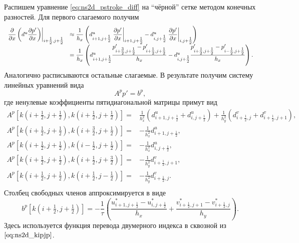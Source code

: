 Распишем уравнение \eqref{eq:ns2d_pstroke_diff}
на ``чёрной'' сетке методом конечных разностей.
Для первого слагаемого получим
\begin{equation}
\label{eq:ns2d_d2pdx2}
\begin{array}{ll}
\left.\dfrac{\partial }{\partial x}\left(d^u \dfrac{\partial p'}{\partial x}\right) \right|_{i+\tfrac12, j+\tfrac12}
    &\approx
        \dfrac{1}{h_x}\left(
            d^u_{i+1, j+\tfrac12} \left. \dfrac{\partial p'}{\partial x} \right|_{i+1, j+\tfrac12} -
            d^u_{i, j+\tfrac12} \left. \dfrac{\partial p'}{\partial x} \right|_{i, j+\tfrac12}
        \right) \\[10pt]

    &=
        \dfrac{1}{h_x}\left(
            d^u_{i+1, j+\tfrac12} \dfrac{p'_{i+\tfrac32,j+\tfrac12} - p'_{i+\tfrac12,j+\tfrac12}}{h_x} - 
            d^u_{i, j+\tfrac12}  \dfrac{p'_{i+\tfrac12,j+\tfrac12} - p'_{i-\tfrac12,j+\tfrac12}}{h_x}
        \right).
\end{array}
\end{equation}
Аналогично расписываются остальные слагаемые. В результате получим систему линейных уравнений вида
\begin{equation}
    \label{eq:ns2d_pstroke_slae}
    A^p p' = b^p,
\end{equation}
где ненулевые коэффициенты пятидиагональной матрицы примут вид
\begin{align}
    \label{eq:ns2d_ap}
    A^p[k(i+\tfrac12, j+\tfrac12), k(i+\tfrac12, j+\tfrac12)] =&
        \frac{1}{h_x^2}\left( d^u_{i+1,j+\tfrac12} + d^u_{i,j+\tfrac12} \right)
        +\frac{1}{h_y^2}\left( d^v_{i+\tfrac12,j} + d^v_{i+\tfrac12,j+1} \right), \\[10pt]
    \nonumber
    A^p[k(i+\tfrac12, j+\tfrac12), k(i+\tfrac32, j+\tfrac12)] =&
        -\frac{1}{h_x^2}d^u_{i+1,j+\tfrac12}, \\[10pt]
    \nonumber
    A^p[k(i+\tfrac12, j+\tfrac12), k(i-\tfrac12, j+\tfrac12)] =&
        -\frac{1}{h_x^2}d^u_{i,j+\tfrac12}, \\[10pt]
    \nonumber
    A^p[k(i+\tfrac12, j+\tfrac12), k(i+\tfrac12, j+\tfrac32)] =&
        -\frac{1}{h_y^2}d^v_{i+\tfrac12,j+1}, \\[10pt]
    \nonumber
    A^p[k(i+\tfrac12, j+\tfrac12), k(i+\tfrac12, j-\tfrac12)] =&
        -\frac{1}{h_y^2}d^v_{i+\tfrac12,j}.\\[10pt]
\end{align}
Столбец свободных членов аппроксимируется в виде
\begin{equation}
    \label{eq:ns2d_bp}
    b^p[k(i+\tfrac12,j+\tfrac12)] = 
        -\frac{1}{\tau}
        \left(
              \frac{u^*_{i+1,j+\tfrac12} - u^*_{i,j+\tfrac12}}{h_x}
            + \frac{v^*_{i+\tfrac12,j+1} - v^*_{i+\tfrac12,j}}{h_y}
        \right).
\end{equation}
Здесь используется функция перевода двумерного индекса в сквозной из $\eqref{eq:ns2d_kipjp}$.

